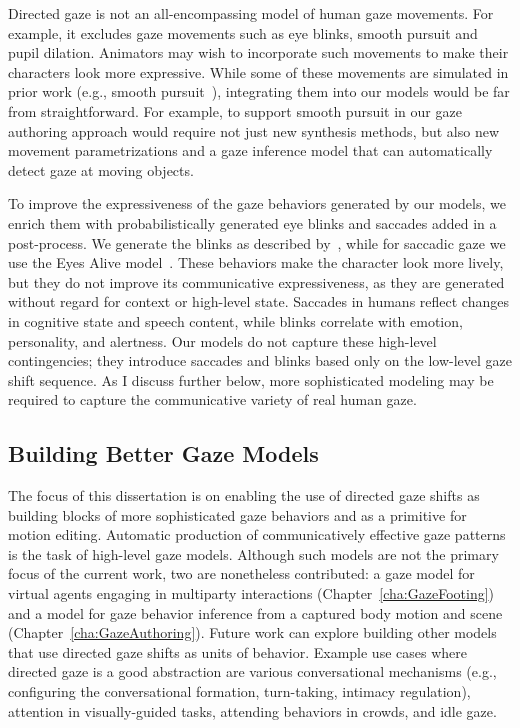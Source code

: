 Directed gaze is not an all-encompassing model of human gaze movements. For example, it excludes gaze movements such as eye blinks, smooth pursuit and pupil dilation. Animators may wish to incorporate such movements to make their characters look more expressive. While some of these movements are simulated in prior work (e.g., smooth pursuit~\citep{yeo2012eyecatch}), integrating them into our models would be far from straightforward. For example, to support smooth pursuit in our gaze authoring approach would require not just new synthesis methods, but also new movement parametrizations and a gaze inference model that can automatically detect gaze at moving objects.

To improve the expressiveness of the gaze behaviors generated by our models, we enrich them with probabilistically generated eye blinks and saccades added in a post-process. We generate the blinks as described by~\citet{peters2010animating}, while for saccadic gaze we use the Eyes Alive model~\citep{lee2002eyes}. These behaviors make the character look more lively, but they do not improve its communicative expressiveness, as they are generated without regard for context or high-level state. Saccades in humans reflect changes in cognitive state and speech content, while blinks correlate with emotion, personality, and alertness. Our models do not capture these high-level contingencies; they introduce saccades and blinks based only on the low-level gaze shift sequence. As I discuss further below, more sophisticated modeling may be required to capture the communicative variety of real human gaze.

\subsection{Building Better Gaze Models}

The focus of this dissertation is on enabling the use of directed gaze shifts as building blocks of more sophisticated gaze behaviors and as a primitive for motion editing. Automatic production of communicatively effective gaze patterns is the task of high-level gaze models. Although such models are not the primary focus of the current work, two are nonetheless contributed: a gaze model for virtual agents engaging in multiparty interactions (Chapter~\ref{cha:GazeFooting}) and a model for gaze behavior inference from a captured body motion and scene (Chapter~\ref{cha:GazeAuthoring}). Future work can explore building other models that use directed gaze shifts as units of behavior. Example use cases where directed gaze is a good abstraction are various conversational mechanisms (e.g., configuring the conversational formation, turn-taking, intimacy regulation), attention in visually-guided tasks, attending behaviors in crowds, and idle gaze.

